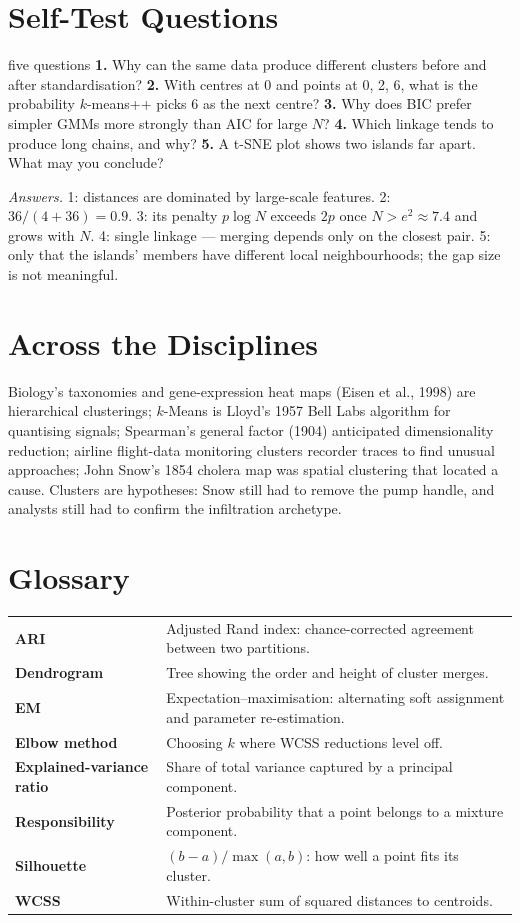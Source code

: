 \documentclass[11pt]{article}
\begin{document}
\section{Self-Test Questions}
\begin{question}{five questions}
\textbf{1.} Why can the same data produce different clusters before and after standardisation? \textbf{2.} With centres at 0 and points at 0, 2, 6, what is the probability $k$-means++ picks 6 as the next centre? \textbf{3.} Why does BIC prefer simpler GMMs more strongly than AIC for large $N$? \textbf{4.} Which linkage tends to produce long chains, and why? \textbf{5.} A t-SNE plot shows two islands far apart. What may you conclude?

\textit{Answers.} 1: distances are dominated by large-scale features. 2: $36/(4+36)=0.9$. 3: its penalty $p\log N$ exceeds $2p$ once $N>e^2\approx7.4$ and grows with $N$. 4: single linkage --- merging depends only on the closest pair. 5: only that the islands' members have different local neighbourhoods; the gap size is not meaningful.
\end{question}

\section{Across the Disciplines}
Biology's taxonomies and gene-expression heat maps (Eisen et al., 1998) are hierarchical clusterings; $k$-Means is Lloyd's 1957 Bell Labs algorithm for quantising signals; Spearman's general factor (1904) anticipated dimensionality reduction; airline flight-data monitoring clusters recorder traces to find unusual approaches; John Snow's 1854 cholera map was spatial clustering that located a cause. Clusters are hypotheses: Snow still had to remove the pump handle, and analysts still had to confirm the infiltration archetype.

\section{Glossary}
\begin{center}\small\renewcommand{\arraystretch}{1.2}
\begin{tabularx}{\textwidth}{>{\bfseries}p{3.3cm}X}\toprule
ARI & Adjusted Rand index: chance-corrected agreement between two partitions.\\
Dendrogram & Tree showing the order and height of cluster merges.\\
EM & Expectation--maximisation: alternating soft assignment and parameter re-estimation.\\
Elbow method & Choosing $k$ where WCSS reductions level off.\\
Explained-variance ratio & Share of total variance captured by a principal component.\\
Responsibility & Posterior probability that a point belongs to a mixture component.\\
Silhouette & $(b-a)/\max(a,b)$: how well a point fits its cluster.\\
WCSS & Within-cluster sum of squared distances to centroids.\\\bottomrule
\end{tabularx}\end{center}
\end{document}
